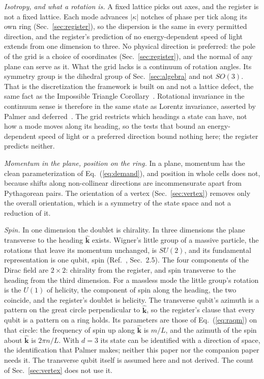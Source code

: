 \documentclass[aps,prd,twocolumn,superscriptaddress,nofootinbib]{revtex4-2}
\begin{document}
\textit{Isotropy, and what a rotation is.} A fixed lattice picks out axes, and the register is not a fixed lattice. Each mode advances $|\kappa|$ notches of phase per tick along its own ring (Sec.~\ref{sec:register}), so the dispersion is the same in every permitted direction, and the register's prediction of no energy-dependent speed of light extends from one dimension to three. No physical direction is preferred: the pole of the grid is a choice of coordinates (Sec.~\ref{sec:register}), and the normal of any plane can serve as it. What the grid lacks is a continuum of rotation angles. Its symmetry group is the dihedral group of Sec.~\ref{sec:algebra} and not $SO(3)$. That is the discretization the framework is built on and not a lattice defect, the same fact as the Impossible Triangle Corollary~\cite{palmer2020,palmer2026b}. Rotational invariance in the continuum sense is therefore in the same state as Lorentz invariance, asserted by Palmer and deferred~\cite{palmer2026c}. The grid restricts which headings a state can have, not how a mode moves along its heading, so the tests that bound an energy-dependent speed of light or a preferred direction bound nothing here; the register predicts neither.

\textit{Momentum in the plane, position on the ring.} In a plane, momentum has the clean parameterization of Eq.~(\ref{eq:demand}), and position in whole cells does not, because shifts along non-collinear directions are incommensurate apart from Pythagorean pairs. The orientation of a vertex (Sec.~\ref{sec:vertex}) removes only the overall orientation, which is a symmetry of the state space and not a reduction of it.

\textit{Spin.} In one dimension the doublet is chirality. In three dimensions the plane transverse to the heading $\hat{\mathbf{k}}$ exists. Wigner's little group of a massive particle, the rotations that leave its momentum unchanged, is $SU(2)$, and its fundamental representation is one qubit, spin (Ref.~\cite{weinberg1995}, Sec.~2.5). The four components of the Dirac field are $2\times2$: chirality from the register, and spin transverse to the heading from the third dimension. For a massless mode the little group's rotation is the $U(1)$ of helicity, the component of spin along the heading, the two coincide, and the register's doublet is helicity. The transverse qubit's azimuth is a pattern on the great circle perpendicular to $\hat{\mathbf{k}}$, so the register's clause that every qubit is a pattern on a ring holds. Its parameters are those of Eq.~(\ref{eq:raqm}) on that circle: the frequency of spin up along $\hat{\mathbf{k}}$ is $m/L$, and the azimuth of the spin about $\hat{\mathbf{k}}$ is $2\pi n/L$. With $d = 3$ its state can be identified with a direction of space, the identification that Palmer makes; neither this paper nor the companion paper needs it. The transverse qubit itself is assumed here and not derived. The count of Sec.~\ref{sec:vertex} does not use it.
\end{document}
